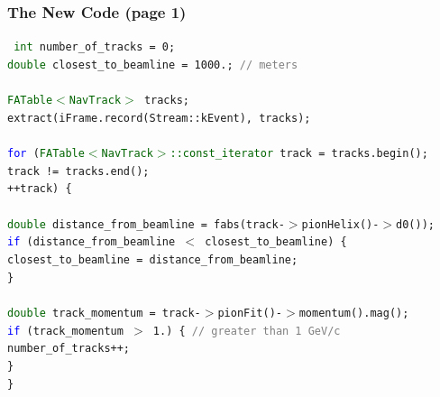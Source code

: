 \documentclass[12pt,compress]{beamer}
\begin{document}
\begin{frame}
\frametitle{The New Code (page 1)}
\tt \scriptsize
\textcolor{darkgreen}{int} number\_of\_tracks = 0; \\
\textcolor{darkgreen}{double} closest\_to\_beamline = 1000.;  \textcolor{gray}{// meters} \\
\mbox{ } \\
\textcolor{darkgreen}{FATable$<$NavTrack$>$} tracks; \\
extract(iFrame.record(Stream::kEvent), tracks); \\
\mbox{ } \\
\textcolor{blue}{for} (\textcolor{darkgreen}{FATable$<$NavTrack$>$::const\_iterator} track = tracks.begin(); \\
\mbox{\hspace{1 cm}}track != tracks.end(); \\
\mbox{\hspace{1 cm}}++track) \{ \\
\mbox{ } \\
\mbox{\hspace{0.5 cm}}\textcolor{darkgreen}{double} distance\_from\_beamline = fabs(track-$>$pionHelix()-$>$d0()); \\
\mbox{\hspace{0.5 cm}}\textcolor{blue}{if} (distance\_from\_beamline $<$ closest\_to\_beamline) \{ \\
\mbox{\hspace{1 cm}}closest\_to\_beamline = distance\_from\_beamline; \\
\mbox{\hspace{0.5 cm}}\} \\
\mbox{ } \\
\mbox{\hspace{0.5 cm}}\textcolor{darkgreen}{double} track\_momentum = track-$>$pionFit()-$>$momentum().mag(); \\
\mbox{\hspace{0.5 cm}}\textcolor{blue}{if} (track\_momentum $>$ 1.) \{  \textcolor{gray}{// greater than 1 GeV/c} \\
\mbox{\hspace{1 cm}}number\_of\_tracks++; \\
\mbox{\hspace{0.5 cm}}\} \\
\} \\
\end{frame}
\end{document}
